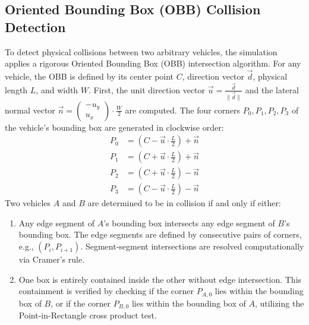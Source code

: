 \documentclass[../report_main.tex]{subfiles}
\begin{document}
\subsection{Oriented Bounding Box (OBB) Collision Detection}
To detect physical collisions between two arbitrary vehicles, the simulation applies a rigorous Oriented Bounding Box (OBB) intersection algorithm. For any vehicle, the OBB is defined by its center point $C$, direction vector $\overrightarrow{d}$, physical length $L$, and width $W$.
First, the unit direction vector $\overrightarrow{u} = \frac{\overrightarrow{d}}{\|\overrightarrow{d}\|}$ and the lateral normal vector $\overrightarrow{n} = \begin{pmatrix} -u_y \\ u_x \end{pmatrix} \cdot \frac{W}{2}$ are computed. The four corners $P_0, P_1, P_2, P_3$ of the vehicle's bounding box are generated in clockwise order:
\begin{align}
    P_0 &= \left(C - \overrightarrow{u} \cdot \frac{L}{2}\right) + \overrightarrow{n} \\
    P_1 &= \left(C + \overrightarrow{u} \cdot \frac{L}{2}\right) + \overrightarrow{n} \\
    P_2 &= \left(C + \overrightarrow{u} \cdot \frac{L}{2}\right) - \overrightarrow{n} \\
    P_3 &= \left(C - \overrightarrow{u} \cdot \frac{L}{2}\right) - \overrightarrow{n}
\end{align}
Two vehicles $A$ and $B$ are determined to be in collision if and only if either:
\begin{enumerate}
    \item Any edge segment of $A$'s bounding box intersects any edge segment of $B$'s bounding box. The edge segments are defined by consecutive pairs of corners, e.g., $(P_i, P_{i+1})$. Segment-segment intersections are resolved computationally via Cramer's rule.
    \item One box is entirely contained inside the other without edge intersection. This containment is verified by checking if the corner $P_{A,0}$ lies within the bounding box of $B$, or if the corner $P_{B,0}$ lies within the bounding box of $A$, utilizing the Point-in-Rectangle cross product test.
\end{enumerate}
\end{document}
